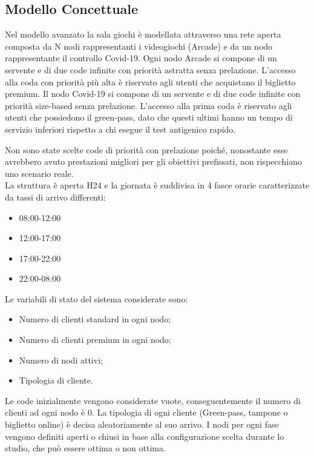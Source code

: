 \documentclass{article}
\begin{document}
\subsection{Modello Concettuale}
Nel modello avanzato la sala giochi è modellata attraverso una rete aperta composta da N nodi rappresentanti i videogiochi (Arcade) e da un nodo rappresentante il controllo Covid-19. Ogni nodo Arcade si compone di un servente e di due code infinite con priorità astratta senza prelazione. L'accesso alla coda con priorità più alta è riservato agli utenti che acquistano il biglietto premium.
Il nodo Covid-19 si compone di un servente e di due code infinite con priorità size-based senza prelazione. L'accesso alla prima coda è riservato agli utenti che possiedono il green-pass, dato che questi ultimi hanno un tempo di servizio inferiori rispetto a chi esegue il test antigenico rapido.
\par Non sono state scelte code di priorità con prelazione poiché, nonostante esse avrebbero avuto prestazioni migliori per gli obiettivi prefissati, non rispecchiano uno scenario reale.
\\
La struttura è aperta H24 e la giornata è suddivisa in 4 fasce orarie caratterizzate da tassi di arrivo differenti:
\begin{itemize}
\item 08:00-12:00
\item 12:00-17:00
\item 17:00-22:00
\item 22:00-08:00



\end{itemize}
Le variabili di stato del sistema considerate sono:
\begin{itemize}
\item Numero di clienti standard in ogni nodo;
\item Numero di clienti premium in ogni nodo;
\item Numero di nodi attivi;
\item Tipologia di cliente.
\end{itemize}
Le code inizialmente vengono considerate vuote, conseguentemente il numero di
clienti ad ogni nodo è 0. La tipologia di ogni cliente (Green-pass, tampone o biglietto online) è decisa aleatoriamente al suo arrivo. I nodi per ogni fase vengono definiti aperti o chiusi in base alla configurazione scelta durante lo studio, che può essere ottima o non
ottima.
\\ \\
\end{document}

